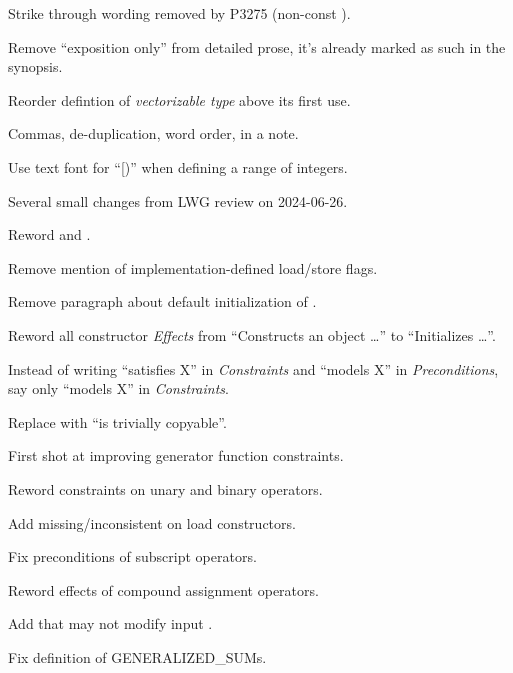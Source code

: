 \begin{revision}
\item Strike through wording removed by P3275 (non-const ).
\item Remove “exposition only” from detailed prose, it's already marked as such in the synopsis.
\item Reorder defintion of \emph{vectorizable type} above its first use.
\item Commas, de-duplication, word order,  in a note.
\item Use text font for “[)” when defining a range of integers.
\item Several small changes from LWG review on 2024-06-26.
\item Reword  and .
\item Remove mention of implementation-defined load/store flags.
\item Remove paragraph about default initialization of \simd.
\item Reword all constructor \emph{Effects} from “Constructs an object \ldots”
  to “Initializes \ldots”.
\item Instead of writing “satisfies X” in \emph{Constraints} and “models X” in
  \emph{Preconditions}, say only “models X” in \emph{Constraints}.
\item Replace  with “is trivially copyable”.
\item First shot at improving generator function constraints.
\item Reword constraints on unary and binary operators.
\item Add missing/inconsistent  on load constructors.
\item Fix preconditions of subscript operators.
\item Reword effects of compound assignment operators.
\item Add that  may not modify input \simd.
\item Fix definition of GENERALIZED_SUMs.
\end{revision}

